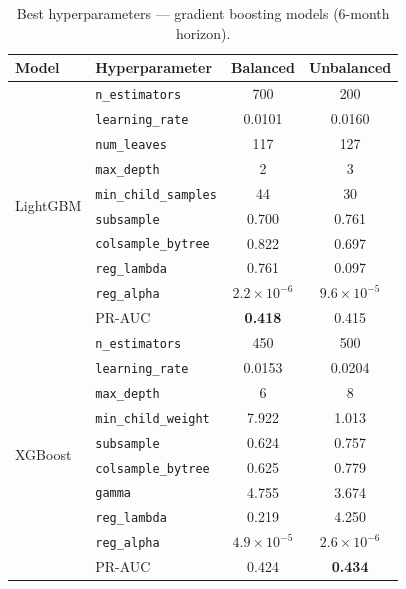 \begin{table}[htbp]
\centering
\caption[Best hyperparameters: gradient boosting models]{Best hyperparameters --- gradient boosting models (6-month horizon).}
\label{tab:best_boosting}
\small
\begin{tabular}{l l c c}
\toprule
\textbf{Model} & \textbf{Hyperparameter} & \textbf{Balanced} & \textbf{Unbalanced} \\
\midrule
\multirow{10}{*}{LightGBM}
  & \texttt{n\_estimators}       & 700     & 200 \\
  & \texttt{learning\_rate}      & 0.0101  & 0.0160 \\
  & \texttt{num\_leaves}         & 117     & 127 \\
  & \texttt{max\_depth}          & 2       & 3 \\
  & \texttt{min\_child\_samples} & 44      & 30 \\
  & \texttt{subsample}           & 0.700   & 0.761 \\
  & \texttt{colsample\_bytree}   & 0.822   & 0.697 \\
  & \texttt{reg\_lambda}         & 0.761   & 0.097 \\
  & \texttt{reg\_alpha}          & $2.2 \times 10^{-6}$ & $9.6 \times 10^{-5}$ \\
  & PR-AUC                       & \textbf{0.418} & 0.415 \\
\midrule
\multirow{10}{*}{XGBoost}
  & \texttt{n\_estimators}       & 450     & 500 \\
  & \texttt{learning\_rate}      & 0.0153  & 0.0204 \\
  & \texttt{max\_depth}          & 6       & 8 \\
  & \texttt{min\_child\_weight}  & 7.922   & 1.013 \\
  & \texttt{subsample}           & 0.624   & 0.757 \\
  & \texttt{colsample\_bytree}   & 0.625   & 0.779 \\
  & \texttt{gamma}               & 4.755   & 3.674 \\
  & \texttt{reg\_lambda}         & 0.219   & 4.250 \\
  & \texttt{reg\_alpha}          & $4.9 \times 10^{-5}$ & $2.6 \times 10^{-6}$ \\
  & PR-AUC                       & 0.424   & \textbf{0.434} \\
\bottomrule
\end{tabular}
\end{table}


